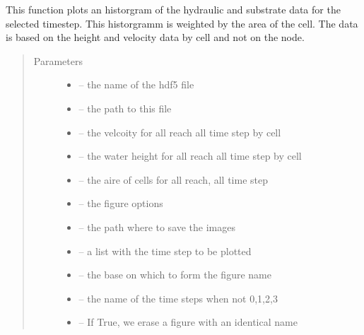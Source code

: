 \documentclass[letterpaper,10pt,english]{sphinxmanual}
\begin{document}
\begin{fulllineitems}
\label{\detokenize{index:src.calcul_hab.plot_hist_hydro}}
This function plots an historgram of the hydraulic and substrate data for the selected timestep. This historgramm
is weighted by the area of the cell. The data is based on the height and velocity data by cell and not on the node.
\begin{quote}\begin{description}
\item[{Parameters}] \leavevmode\begin{itemize}
\item {} 
 -- the name of the hdf5 file

\item {} 
 -- the path to this file

\item {} 
 -- the velcoity for all reach all time step by cell

\item {} 
 -- the water height for all reach all time step by cell

\item {} 
 -- the aire of cells for all reach, all time step

\item {} 
 -- the figure options

\item {} 
 -- the path where to save the images

\item {} 
 -- a list with the time step to be plotted

\item {} 
 -- the base on which to form the figure name

\item {} 
 -- the name of the time steps when not 0,1,2,3

\item {} 
 -- If True, we erase a figure with an identical name

\end{itemize}

\end{description}\end{quote}

\end{fulllineitems}
\end{document}
